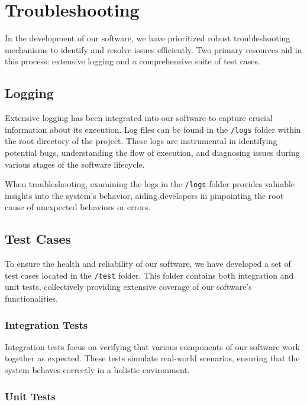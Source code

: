 \documentclass{report}
\begin{document}
\chapter{Troubleshooting}\label{chap:troubleshooting}

In the development of our software, we have prioritized robust troubleshooting mechanisms to identify and resolve issues efficiently. Two primary resources aid in this process: extensive logging and a comprehensive suite of test cases.

\section{Logging}

Extensive logging has been integrated into our software to capture crucial information about its execution. Log files can be found in the \texttt{/logs} folder within the root directory of the project. These logs are instrumental in identifying potential bugs, understanding the flow of execution, and diagnosing issues during various stages of the software lifecycle.

When troubleshooting, examining the logs in the \texttt{/logs} folder provides valuable insights into the system's behavior, aiding developers in pinpointing the root cause of unexpected behaviors or errors.

\section{Test Cases}

To ensure the health and reliability of our software, we have developed a set of test cases located in the \texttt{/test} folder. This folder contains both integration and unit tests, collectively providing extensive coverage of our software's functionalities.

\subsection{Integration Tests}

Integration tests focus on verifying that various components of our software work together as expected. These tests simulate real-world scenarios, ensuring that the system behaves correctly in a holistic environment.

\subsection{Unit Tests}
\end{document}
